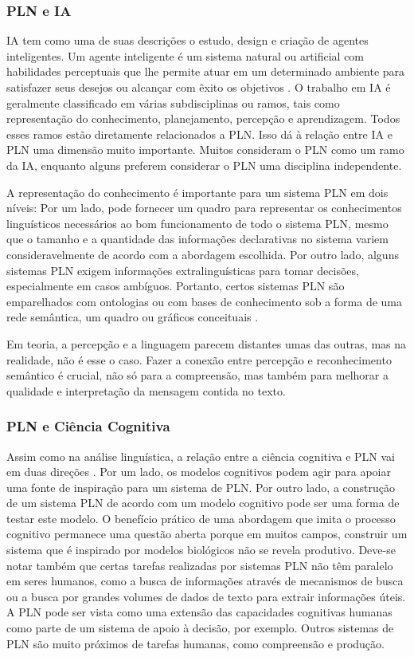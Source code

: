 \documentclass[
	12pt,				%
	openright,			%
	oneside,			%
	a4paper,			%
	english,			%
	spanish,			%
	brazil				%
	]{abntex2}
\begin{document}
	\subsubsection*{\gls{PLN} e \gls{IA}}
	\gls{IA} tem como uma de suas descrições o estudo, design e criação de agentes inteligentes. Um agente inteligente é um sistema natural ou artificial com habilidades perceptuais que lhe permite atuar em um determinado ambiente para satisfazer seus desejos ou alcançar com êxito os objetivos \cite{norvig3rd}. O trabalho em \gls{IA} é geralmente classificado em várias subdisciplinas ou ramos, tais como representação do conhecimento, planejamento, percepção e aprendizagem. Todos esses ramos estão diretamente relacionados a \gls{PLN}. Isso dá à relação entre \gls{IA} e \gls{PLN} uma dimensão muito importante. Muitos consideram o \gls{PLN} como um ramo da \gls{IA}, enquanto alguns preferem considerar o \gls{PLN} uma disciplina independente. 

	
A representação do conhecimento é importante para um sistema \gls{PLN} em dois níveis: Por um lado, pode fornecer um quadro para representar os conhecimentos linguísticos necessários ao bom funcionamento de todo o sistema \gls{PLN}, mesmo que o tamanho e a quantidade das informações declarativas no sistema variem consideravelmente de acordo com a abordagem escolhida. Por outro lado, alguns sistemas \gls{PLN} exigem informações extralinguísticas para tomar decisões, especialmente em casos ambíguos. Portanto, certos sistemas \gls{PLN} são emparelhados com ontologias ou com bases de conhecimento sob a forma de uma rede semântica, um quadro ou gráficos conceituais \cite{book_natural_lang}.

Em teoria, a percepção e a linguagem parecem distantes umas das outras, mas na realidade, não é esse o caso. Fazer a conexão entre percepção e reconhecimento semântico é crucial, não só para a compreensão, mas também para melhorar a qualidade e interpretação da mensagem contida no texto. 

	\subsubsection*{\gls{PLN} e Ciência Cognitiva}
	Assim como na análise linguística, a relação entre a ciência cognitiva e \gls{PLN} vai em duas direções \cite{book_natural_lang}. Por um lado, os modelos cognitivos podem agir para apoiar uma fonte de inspiração para um sistema de \gls{PLN}. Por outro lado, a construção de um sistema \gls{PLN} de acordo com um modelo cognitivo pode ser uma forma de testar este modelo. O benefício prático de uma abordagem que imita o processo cognitivo permanece uma questão aberta porque em muitos campos, construir um sistema que é inspirado por modelos biológicos não se revela produtivo. Deve-se notar também que certas tarefas realizadas por sistemas \gls{PLN} não têm paralelo em seres humanos, como a busca de informações através de mecanismos de busca ou a busca por grandes volumes de dados de texto para extrair informações úteis. A \gls{PLN} pode ser vista como uma extensão das capacidades cognitivas humanas como parte de um sistema de apoio à decisão, por exemplo. Outros sistemas de \gls{PLN} são muito próximos de tarefas humanas, como compreensão e produção.
	
\end{document}
